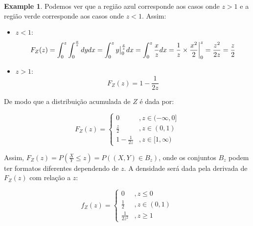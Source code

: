 \documentclass[
]{article}
\providecommand{\tightlist}{%
  \setlength{\itemsep}{0pt}\setlength{\parskip}{0pt}}
\theoremstyle{definition}
\theoremstyle{definition}
\newtheorem{example}{Example}[section]
\theoremstyle{definition}
\theoremstyle{definition}
\theoremstyle{remark}
\begin{document}
\begin{example}
Podemos ver que a região azul corresponde aos casos onde \(z > 1\) e a região verde corresponde aos casos onde \(z < 1\). Assim:

\begin{itemize}
\tightlist
\item
  \(z<1\): \begin{equation*}F_{Z}(z) = \int_{0}^{z}\int_{0}^{\frac{x}{z}}dydx = \int_{0}^{z}y\big{|}_{0}^{\frac{x}{z}}dx = \int_{0}^{z}\frac{x}{z}dx = \frac{1}{z} \times \frac{x^{2}}{2}\bigg{|}_{0}^{z} = \frac{z^{2}}{2z} = \frac{z}{2}\end{equation*}
\item
  \(z>1\): \begin{equation*}F_{Z}(z) = 1 - \frac{1}{2z}\end{equation*}
\end{itemize}

De modo que a distribuição acumulada de \(Z\) é dada por:

\begin{equation*}
F_{Z}(z) = \begin{cases}
0 & ,z \in (-\infty,0] \\
\frac{z}{2} & ,z \in (0,1) \\
1-\frac{1}{2z} & ,z \in [1,\infty)
\end{cases}
\end{equation*}

Assim, \(F_{Z}(z) = P\left(\frac{X}{Y} \le z \right) = P((X,Y) \in B_{z})\), onde os conjuntos \(B_{z}\) podem ter formatos diferentes dependendo de \(z\). A densidade será dada pela derivada de \(F_{Z}(z)\) com relação a \(z\):

\begin{equation*}
f_{Z}(z) = \begin{cases}
0 & ,z \le 0 \\
\frac{1}{2} & ,z \in (0,1) \\
\frac{1}{2z^{2}} & ,z \ge 1
\end{cases}
\end{equation*}
\end{example}
\end{document}
